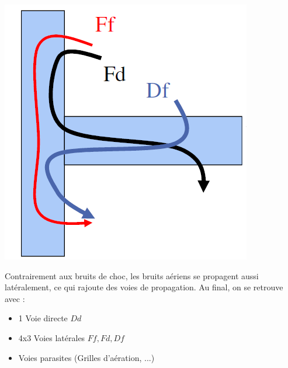\documentclass[11pt]{report}
\begin{document}
\begin{minipage}{0.3\linewidth}
\centering
\includegraphics[scale=0.4]{tran}
\end{minipage}
\begin{minipage}{0.65\linewidth}
Contrairement aux bruits de choc, les bruits aériens se propagent aussi latéralement, ce qui rajoute des voies de propagation.
Au final, on se retrouve avec : 
\begin{itemize}
\item 1 Voie directe $Dd$
\item 4x3 Voies latérales $Ff,Fd,Df$
\item Voies parasites (Grilles d'aération, ...)
\end{itemize}
\end{minipage}
\end{document}
